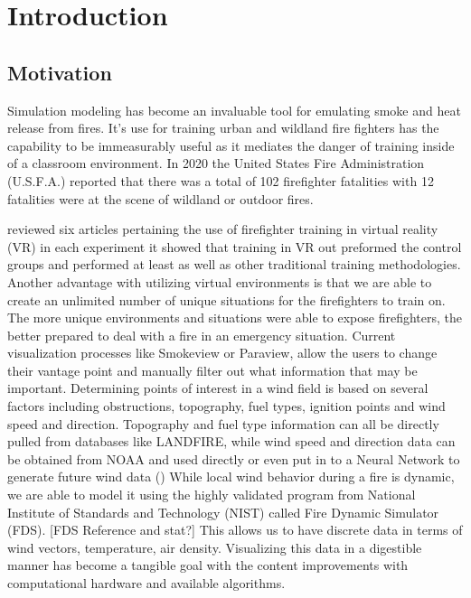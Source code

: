 
\chapter{Introduction} %

\label{ChapterX} %


\section{Motivation}

Simulation modeling has become an invaluable tool for emulating smoke and heat release from fires. It’s use for training urban and wildland fire fighters has the capability to be immeasurably useful as it mediates the danger of training inside of a classroom environment. In 2020 the United States Fire Administration (U.S.F.A.) reported that there was a total of 102 firefighter fatalities with 12 fatalities were at the scene of wildland or outdoor fires. \cite{FireFatalities}

\cite{Wheeler2021} reviewed six articles pertaining the use of firefighter training in virtual reality (VR) in each experiment it showed that training in VR out preformed the control groups and performed at least as well as other traditional training methodologies. Another advantage with utilizing virtual environments is that we are able to create an unlimited number of unique situations for the firefighters to train on. The more unique environments and situations were able to expose firefighters, the better prepared to deal with a fire in an emergency situation. Current visualization processes like Smokeview or Paraview, allow the users to change their vantage point and manually filter out what information that may be important. Determining points of interest in a wind field is based on several factors including obstructions, topography, fuel types, ignition points and wind speed and direction. 
Topography and fuel type information can all be directly pulled from databases like LANDFIRE, while wind speed and direction data can be obtained from NOAA and used directly or even put in to a Neural Network to generate future wind data (\cite{WindNN})  While local wind behavior during a fire is dynamic, we are able to model it using the highly validated  program from National Institute of Standards and Technology (NIST) called Fire Dynamic Simulator (FDS). [FDS Reference and stat?] This allows us to have discrete data in terms of wind vectors, temperature, air density. Visualizing this data in a digestible manner has become a tangible goal with the content improvements with computational hardware and available algorithms.




